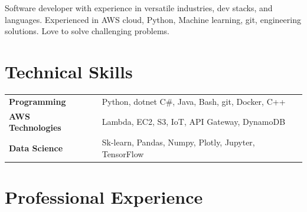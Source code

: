 \documentclass[letter,10pt]{article}
\newcommand{\hskills}[1]{
	\textbf{\bfseries #1} }
\begin{document}
		\vspace{0.25cm} 
		{\color{UI_black} \hrulefill}
	
	\vspace{0.2 cm}
	Software developer with experience in versatile industries, dev stacks, and languages. 
	Experienced in AWS cloud, Python, Machine learning, git, engineering solutions.
	Love to solve challenging problems.
	\vspace{-0.2cm}
	
	
	\section{Technical Skills}
	\begin{tabular}{p{11em} p{1em} p{43em}}
		\hskills{Programming} &  & Python, dotnet C\#, Java, Bash, git, Docker, C++  \\
		\hskills{AWS Technologies}&  &  Lambda, EC2, S3, IoT, API Gateway, DynamoDB \\
		\hskills{Data Science} &  & Sk-learn, Pandas, Numpy, Plotly, Jupyter, TensorFlow \\
	\end{tabular}
	\vspace{-0.2cm}
	
	
	\section{Professional Experience}
	
	
\end{document}
